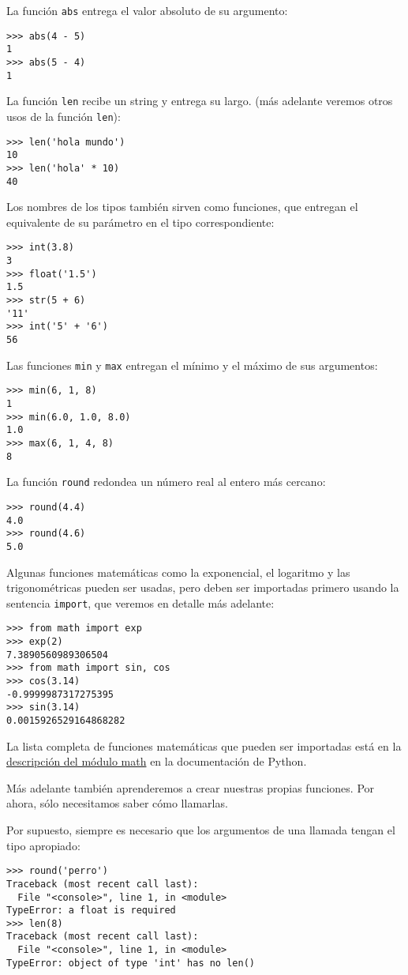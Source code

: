 La función \lstinline!abs! entrega el valor absoluto de su argumento:

\begin{lstlisting}
>>> abs(4 - 5)
1
>>> abs(5 - 4)
1
\end{lstlisting}

La función \lstinline!len! recibe un string y entrega su largo. (más
adelante veremos otros usos de la función \lstinline!len!):

\begin{lstlisting}
>>> len('hola mundo')
10
>>> len('hola' * 10)
40
\end{lstlisting}

Los nombres de los tipos también sirven como funciones, que entregan el
equivalente de su parámetro en el tipo correspondiente:

\begin{lstlisting}
>>> int(3.8)
3
>>> float('1.5')
1.5
>>> str(5 + 6)
'11'
>>> int('5' + '6')
56
\end{lstlisting}

Las funciones \lstinline!min! y \lstinline!max! entregan el mínimo y el
máximo de sus argumentos:

\begin{lstlisting}
>>> min(6, 1, 8)
1
>>> min(6.0, 1.0, 8.0)
1.0
>>> max(6, 1, 4, 8)
8
\end{lstlisting}

La función \lstinline!round! redondea un número real al entero más
cercano:

\begin{lstlisting}
>>> round(4.4)
4.0
>>> round(4.6)
5.0
\end{lstlisting}

Algunas funciones matemáticas como la exponencial, el logaritmo y las
trigonométricas pueden ser usadas, pero deben ser importadas primero
usando la sentencia \lstinline!import!, que veremos en detalle más
adelante:

\begin{lstlisting}
>>> from math import exp
>>> exp(2)
7.3890560989306504
>>> from math import sin, cos
>>> cos(3.14)
-0.9999987317275395
>>> sin(3.14)
0.0015926529164868282
\end{lstlisting}

La lista completa de funciones matemáticas que pueden ser importadas
está en la \href{http://docs.python.org/library/math.html}{descripción
del módulo math} en la documentación de Python.

Más adelante también aprenderemos a crear nuestras propias funciones.
Por ahora, sólo necesitamos saber cómo llamarlas.

Por supuesto, siempre es necesario que los argumentos de una llamada
tengan el tipo apropiado:

\begin{lstlisting}
>>> round('perro')
Traceback (most recent call last):
  File "<console>", line 1, in <module>
TypeError: a float is required
>>> len(8)
Traceback (most recent call last):
  File "<console>", line 1, in <module>
TypeError: object of type 'int' has no len()
\end{lstlisting}

